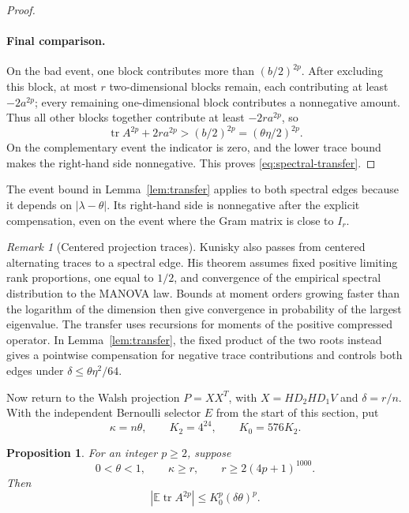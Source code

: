 \documentclass[11pt]{article}
\newtheorem{proposition}[theorem]{Proposition}
\theoremstyle{definition}
\theoremstyle{remark}
\newtheorem*{remark}{Remark}
\theoremstyle{plain}
\newcommand{\E}{\mathbb E}
\DeclareMathOperator{\tr}{tr}
\begin{document}
\begin{proof}
\paragraph{Final comparison.}
On the bad event, one block contributes more than \((b/2)^{2p}\).
After excluding this block, at most \(r\) two-dimensional blocks
remain, each contributing at least \(-2a^{2p}\); every remaining
one-dimensional block contributes a nonnegative amount.
Thus all other blocks together contribute at least \(-2ra^{2p}\),
so
\[
 \tr A^{2p}+2ra^{2p}>(b/2)^{2p}=(\theta\eta/2)^{2p}.
\]
On the complementary event the indicator is zero, and the lower
trace bound makes the right-hand side nonnegative.
This proves \eqref{eq:spectral-transfer}.
\end{proof}

The event bound in Lemma~\ref{lem:transfer} applies to both spectral
edges because it depends on $|\lambda-\theta|$. Its right-hand side
is nonnegative after the explicit compensation, even on the event
where the Gram matrix is close to $I_r$.

\begin{remark}[Centered projection traces]
Kunisky \cite[Theorem~1.12 and Sections~4--5]{kunisky_manova}
also passes from centered alternating traces to a spectral edge.
His theorem assumes fixed positive limiting rank proportions, one
equal to $1/2$, and convergence of the empirical spectral distribution
to the MANOVA law. Bounds at moment orders growing faster than the
logarithm of the dimension then give convergence in probability of the largest
eigenvalue. The transfer uses recursions for moments of the positive
compressed operator. In Lemma~\ref{lem:transfer}, the fixed product
of the two roots instead gives a pointwise compensation for negative
trace contributions and controls both edges under
$\delta\le\theta\eta^2/64$.
\end{remark}

Now return to the Walsh projection $P=XX^T$, with
$X=HD_2HD_1V$ and $\delta=r/n$. With the independent Bernoulli
selector $E$ from the start of this section, put
\[
 \kappa=n\theta,\qquad K_2=4^{24},\qquad K_0=576K_2.
\]
\begin{proposition}\label{prop:trace}
For an integer \(p\ge2\), suppose
\begin{equation}\label{eq:trace-hypotheses}
 0<\theta<1,\qquad \kappa\ge r,\qquad
                         r\ge2(4p+1)^{1000}.
\end{equation}
Then
\begin{equation}\label{eq:trace-bound}
                  \left|\E\tr A^{2p}\right|
                           \le K_0^p(\delta\theta)^p.
\end{equation}
\end{proposition}
\end{document}
